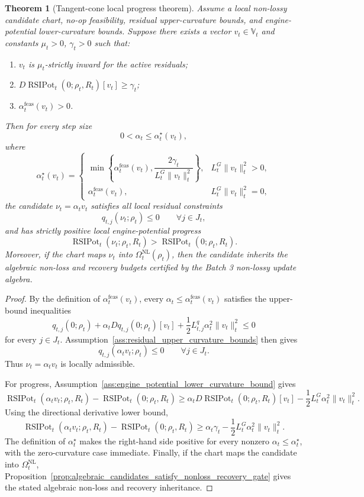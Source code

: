 \documentclass[11pt]{article}
\newtheorem{theorem}{Theorem}[section]
\newcommand{\1}{\mathbf{1}}
\begin{document}
\begin{theorem}[Tangent-cone local progress theorem]
\label{thm:tangent_cone_local_progress}
Assume a local non-lossy candidate chart, no-op feasibility, residual upper-curvature bounds, and engine-potential lower-curvature bounds.  Suppose there exists a vector \(v_t\in\mathbb V_t\) and constants \(\mu_t>0\), \(\gamma_t>0\) such that:
\begin{enumerate}[label=(\roman*),leftmargin=1.5em]
    \item \(v_t\) is \(\mu_t\)-strictly inward for the active residuals;
    \item \(D\operatorname{RSIPot}_t(0;\rho_t,R_t)[v_t]\ge\gamma_t\);
    \item \(\alpha_t^{\mathrm{feas}}(v_t)>0\).
\end{enumerate}
Then for every step size
\[
0<\alpha_t\le \alpha_t^{\star}(v_t),
\]
where
\[
\alpha_t^{\star}(v_t)=
\begin{cases}
\min\left\{\alpha_t^{\mathrm{feas}}(v_t),\dfrac{2\gamma_t}{L_t^{G}\|v_t\|_t^2}\right\},&L_t^G\|v_t\|_t^2>0,\\[1.1em]
\alpha_t^{\mathrm{feas}}(v_t),&L_t^G\|v_t\|_t^2=0,
\end{cases}
\]
the candidate \(\nu_t=\alpha_t v_t\) satisfies all local residual constraints
\[
q_{t,j}(\nu_t;\rho_t)\le0
\qquad\forall j\in J_t,
\]
and has strictly positive local engine-potential progress
\[
\operatorname{RSIPot}_t(\nu_t;\rho_t,R_t)
>
\operatorname{RSIPot}_t(0;\rho_t,R_t).
\]
Moreover, if the chart maps \(\nu_t\) into \(\Omega_t^{\mathrm{NL}}(\rho_t)\), then the candidate inherits the algebraic non-loss and recovery budgets certified by the Batch 3 non-lossy update algebra.
\end{theorem}

\begin{proof}
By the definition of \(\alpha_t^{\mathrm{feas}}(v_t)\), every \(\alpha_t\le\alpha_t^{\mathrm{feas}}(v_t)\) satisfies the upper-bound inequalities
\[
q_{t,j}(0;\rho_t)
+\alpha_tDq_{t,j}(0;\rho_t)[v_t]
+\frac12L_{t,j}^{q}\alpha_t^2\|v_t\|_t^2
\le0
\]
for every \(j\in J_t\).  Assumption~\ref{ass:residual_upper_curvature_bounds} then gives
\[
q_{t,j}(\alpha_t v_t;\rho_t)\le0
\qquad\forall j\in J_t.
\]
Thus \(\nu_t=\alpha_t v_t\) is locally admissible.

For progress, Assumption~\ref{ass:engine_potential_lower_curvature_bound} gives
\[
\operatorname{RSIPot}_t(\alpha_t v_t;\rho_t,R_t)
-
\operatorname{RSIPot}_t(0;\rho_t,R_t)
\ge
\alpha_t D\operatorname{RSIPot}_t(0;\rho_t,R_t)[v_t]
-\frac12L_t^G\alpha_t^2\|v_t\|_t^2.
\]
Using the directional derivative lower bound,
\[
\operatorname{RSIPot}_t(\alpha_t v_t;\rho_t,R_t)
-
\operatorname{RSIPot}_t(0;\rho_t,R_t)
\ge
\alpha_t\gamma_t-\frac12L_t^G\alpha_t^2\|v_t\|_t^2.
\]
The definition of \(\alpha_t^{\star}\) makes the right-hand side positive for every nonzero \(\alpha_t\le\alpha_t^{\star}\), with the zero-curvature case immediate.  Finally, if the chart maps the candidate into \(\Omega_t^{\mathrm{NL}}\), Proposition~\ref{prop:algebraic_candidates_satisfy_nonloss_recovery_gate} gives the stated algebraic non-loss and recovery inheritance.
\end{proof}
\end{document}

